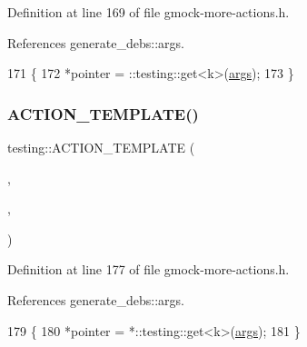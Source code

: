 Definition at line 169 of file gmock-\/more-\/actions.\+h.



References generate\+\_\+debs\+::args.


\begin{DoxyCode}
171                                              \{
172   *pointer = ::testing::get<k>(\hyperlink{namespacegenerate__debs_a75f9143e38df82d83b2e8a6f99cae02c}{args});
173 \}
\end{DoxyCode}
\mbox{\label{namespacetesting_a31565a90ad7f08c1a88e4b138957172c}} 
\subsubsection{\texorpdfstring{A\+C\+T\+I\+O\+N\+\_\+\+T\+E\+M\+P\+L\+A\+T\+E()}{ACTION\_TEMPLATE()}\hspace{0.1cm}{\footnotesize\ttfamily [3/28]}}
{\footnotesize\ttfamily testing\+::\+A\+C\+T\+I\+O\+N\+\_\+\+T\+E\+M\+P\+L\+A\+TE (\begin{DoxyParamCaption}\item[{Save\+Arg\+Pointee}]{,  }\item[{H\+A\+S\+\_\+1\+\_\+\+T\+E\+M\+P\+L\+A\+T\+E\+\_\+\+P\+A\+R\+A\+MS(int, k)}]{,  }\item[{A\+N\+D\+\_\+1\+\_\+\+V\+A\+L\+U\+E\+\_\+\+P\+A\+R\+A\+MS(pointer)}]{ }\end{DoxyParamCaption})}



Definition at line 177 of file gmock-\/more-\/actions.\+h.



References generate\+\_\+debs\+::args.


\begin{DoxyCode}
179                                              \{
180   *pointer = *::testing::get<k>(\hyperlink{namespacegenerate__debs_a75f9143e38df82d83b2e8a6f99cae02c}{args});
181 \}
\end{DoxyCode}
\mbox{\label{namespacetesting_adfd3c9538285d257370f955aa81488f1}} 
